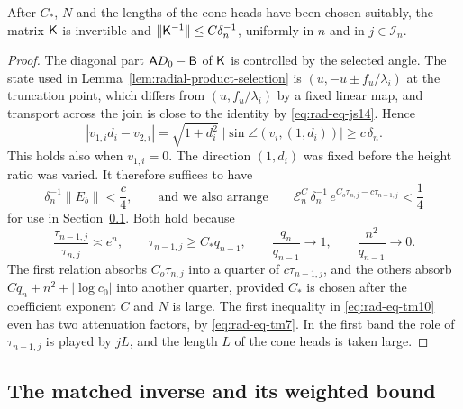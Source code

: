 \begin{lemma}\label{lem:matching}
After $C_*$, $N$ and the lengths of the cone heads have been chosen
suitably, the matrix $\mathsf K$ is invertible and
$\|\mathsf K^{-1}\|\le C\delta_n^{-1}$, uniformly in $n$ and in
$j\in\mathcal I_n$.
\end{lemma}

\begin{proof}
The diagonal part $\mathsf A D_0-\mathsf B$ of $\mathsf K$ is controlled by the selected
angle. The state used in Lemma~\ref{lem:radial-product-selection} is
$(u,-u\pm f_u/\lambda_i)$ at the truncation point, which differs from
$(u,f_u/\lambda_i)$ by a fixed linear map, and transport across the
join is close to the identity by \eqref{eq:rad-eq-js14}. Hence
\begin{equation}\label{eq:rad-eq-tm9}
 |v_{1,i}d_i-v_{2,i}|
 =\sqrt{1+d_i^2}\;|\sin\angle(v_i,(1,d_i))|
 \ge c\,\delta_n .
\end{equation}
This holds also when $v_{1,i}=0$. The direction $(1,d_i)$ was fixed
before the height ratio was varied. It therefore suffices to have
\begin{equation}\label{eq:rad-eq-tm10}
 \delta_n^{-1}\|E_b\|<\frac c4,
 \qquad\text{and we also arrange}\qquad
 \mathcal E_n^C\,\delta_n^{-1}\,
     e^{C_o\tau_{n,j}-c\tau_{n-1,j}}<\frac14
\end{equation}
for use in Section~\ref{subsec:global-estimate}. Both hold because
\[
 \frac{\tau_{n-1,j}}{\tau_{n,j}}\asymp e^n,\qquad
 \tau_{n-1,j}\ge C_*q_{n-1},\qquad
 \frac{q_n}{q_{n-1}}\to1,\qquad \frac{n^2}{q_{n-1}}\to0 .
\]
The first relation absorbs $C_o\tau_{n,j}$ into a quarter of
$c\tau_{n-1,j}$, and the others absorb $Cq_n+n^2+|\log c_0|$ into
another quarter, provided $C_*$ is chosen after the coefficient
exponent $C$ and $N$ is large. The first inequality in
\eqref{eq:rad-eq-tm10} even has two attenuation factors, by
\eqref{eq:rad-eq-tm7}. In the first band the role of $\tau_{n-1,j}$ is
played by $jL$, and the length $L$ of the cone heads is taken large.
\end{proof}

\subsection{The matched inverse and its weighted bound}
\label{subsec:global-estimate}

